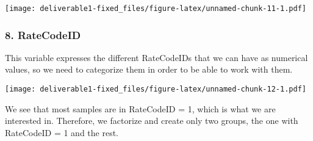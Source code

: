 \documentclass[
  18pt,
  a4paper]{article}
\newenvironment{Shaded}{\begin{snugshade}}{\end{snugshade}}
\newcommand{\CommentTok}[1]{\textcolor[rgb]{0.56,0.35,0.01}{\textit{#1}}}
\newcommand{\DataTypeTok}[1]{\textcolor[rgb]{0.13,0.29,0.53}{#1}}
\newcommand{\KeywordTok}[1]{\textcolor[rgb]{0.13,0.29,0.53}{\textbf{#1}}}
\newcommand{\NormalTok}[1]{#1}
\newcommand{\OperatorTok}[1]{\textcolor[rgb]{0.81,0.36,0.00}{\textbf{#1}}}
\newcommand{\StringTok}[1]{\textcolor[rgb]{0.31,0.60,0.02}{#1}}
\begin{document}
\begin{Shaded}
\end{Shaded}

\texttt{[image: deliverable1-fixed\_files/figure-latex/unnamed-chunk-11-1.pdf]}

\hypertarget{ratecodeid}{%
\subsubsection{8. RateCodeID}\label{ratecodeid}}

This variable expresses the different RateCodeIDs that we can have as
numerical values, so we need to categorize them in order to be able to
work with them.

\begin{Shaded}
\end{Shaded}

\texttt{[image: deliverable1-fixed\_files/figure-latex/unnamed-chunk-12-1.pdf]}

We see that most samples are in RateCodeID = 1, which is what we are
interested in. Therefore, we factorize and create only two groups, the
one with RateCodeID = 1 and the rest.
\end{document}
